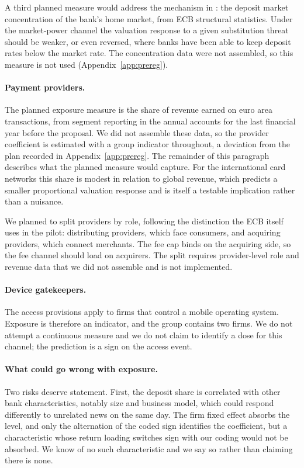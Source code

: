 \documentclass[11pt]{article}
\theoremstyle{plain}\newtheorem{proposition}{Proposition}
\begin{document}
A third planned measure would address the mechanism in \citet{chiu2023}: the deposit market concentration of the bank's home market, from ECB structural statistics. Under the market-power channel the valuation response to a given substitution threat should be weaker, or even reversed, where banks have been able to keep deposit rates below the market rate. The concentration data were not assembled, so this measure is not used (Appendix~\ref{app:prereg}).

\paragraph{Payment providers.} The planned exposure measure is the share of revenue earned on euro area transactions, from segment reporting in the annual accounts for the last financial year before the proposal. We did not assemble these data, so the provider coefficient is estimated with a group indicator throughout, a deviation from the plan recorded in Appendix~\ref{app:prereg}. The remainder of this paragraph describes what the planned measure would capture. For the international card networks this share is modest in relation to global revenue, which predicts a smaller proportional valuation response and is itself a testable implication rather than a nuisance.

We planned to split providers by role, following the distinction the ECB itself uses in the pilot: distributing providers, which face consumers, and acquiring providers, which connect merchants. The fee cap binds on the acquiring side, so the fee channel should load on acquirers. The split requires provider-level role and revenue data that we did not assemble and is not implemented.

\paragraph{Device gatekeepers.} The access provisions apply to firms that control a mobile operating system. Exposure is therefore an indicator, and the group contains two firms. We do not attempt a continuous measure and we do not claim to identify a dose for this channel; the prediction is a sign on the access event.

\paragraph{What could go wrong with exposure.} Two risks deserve statement. First, the deposit share is correlated with other bank characteristics, notably size and business model, which could respond differently to unrelated news on the same day. The firm fixed effect absorbs the level, and only the alternation of the coded sign identifies the coefficient, but a characteristic whose return loading switches sign with our coding would not be absorbed. We know of no such characteristic and we say so rather than claiming there is none.
\end{document}
